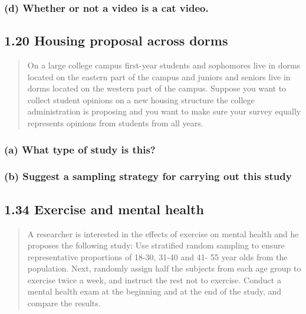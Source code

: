 \documentclass[
]{article}
\begin{document}
\subsubsection{(d) Whether or not a video is a cat
video.}\label{d-whether-or-not-a-video-is-a-cat-video.}

\subsection{1.20 Housing proposal across
dorms}\label{housing-proposal-across-dorms}

\begin{quote}
On a large college campus first-year students and sophomores live in
dorms located on the eastern part of the campus and juniors and seniors
live in dorms located on the western part of the campus. Suppose you
want to collect student opinions on a new housing structure the college
administration is proposing and you want to make sure your survey
equally represents opinions from students from all years.
\end{quote}

\subsubsection{(a) What type of study is
this?}\label{a-what-type-of-study-is-this}

\subsubsection{(b) Suggest a sampling strategy for carrying out this
study}\label{b-suggest-a-sampling-strategy-for-carrying-out-this-study}

\subsection{1.34 Exercise and mental
health}\label{exercise-and-mental-health}

\begin{quote}
A researcher is interested in the effects of exercise on mental health
and he proposes the following study: Use stratified random sampling to
ensure representative proportions of 18-30, 31-40 and 41- 55 year olds
from the population. Next, randomly assign half the subjects from each
age group to exercise twice a week, and instruct the rest not to
exercise. Conduct a mental health exam at the beginning and at the end
of the study, and compare the results.
\end{quote}
\end{document}
